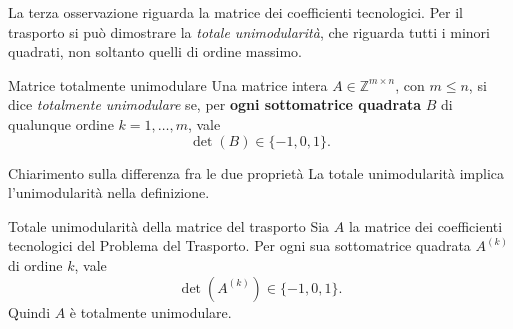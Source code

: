 \newpage
La terza osservazione riguarda la matrice dei coefficienti tecnologici.
Per il trasporto si può dimostrare la \emph{totale unimodularità},
che riguarda tutti i minori quadrati, non soltanto quelli
di ordine massimo.

\begin{definition}{Matrice totalmente unimodulare}
Una matrice intera \(A\in\mathbb Z^{m\times n}\), con \(m\leq n\),
si dice \emph{totalmente unimodulare} se, per \textbf{ogni sottomatrice
quadrata} \(B\) di qualunque ordine \(k=1,\ldots,m\), vale
\[
\det(B)\in\{-1,0,1\}.
\]

\end{definition}

\begin{remark}{Chiarimento sulla differenza fra le due proprietà}
La totale unimodularità implica l'unimodularità nella definizione.
\end{remark}

\begin{theorem}{Totale unimodularità della matrice del trasporto}
\label{thm:trasporto-tu}
Sia \(A\) la matrice dei coefficienti tecnologici del Problema
del Trasporto. Per ogni sua sottomatrice quadrata \(A^{(k)}\)
di ordine \(k\), vale
\[
\det\!\left(A^{(k)}\right)\in\{-1,0,1\}.
\]
Quindi \(A\) è totalmente unimodulare.
\end{theorem}

